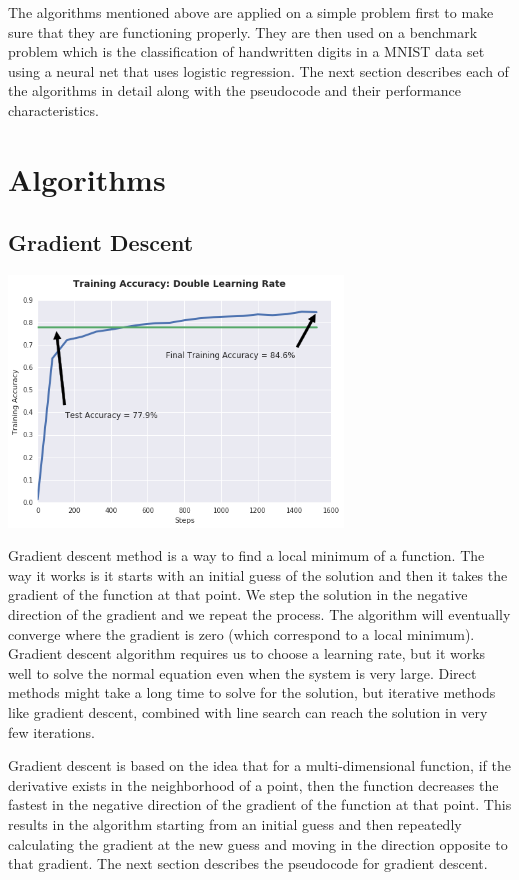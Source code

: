 \documentclass[10pt,twocolumn]{article}
\begin{document}
The algorithms mentioned above are applied on a simple problem first to make sure that they are functioning properly. They are then used on a benchmark problem which is the classification of handwritten digits in a MNIST data set using a neural net that uses logistic regression. The next section describes each of the algorithms in detail along with the pseudocode and their performance characteristics. 

\section{Algorithms}

\subsection{Gradient Descent}
	\includegraphics[width=3.5in]{plot1-GradDescent.png}

Gradient descent method is a way to find a local minimum of a function. The way it works is it starts with an initial guess of the solution and then it takes the gradient of the function at that point. We step the solution in the negative direction of the gradient and we repeat the process. The algorithm will eventually converge where the gradient is zero (which correspond to a local minimum). Gradient descent algorithm requires us to choose a learning rate, but it works well to solve the normal equation even when the system is very large. Direct methods might take a long time to solve for the solution, but iterative methods like gradient descent, combined with line search can reach the solution in very few iterations. 

Gradient descent is based on the idea that for a multi-dimensional function, if the derivative exists in the neighborhood of a point, then the function decreases the fastest in the negative direction of the gradient of the function  at that point. This results in the algorithm starting from an initial guess and then repeatedly calculating the gradient at the new guess and moving in the direction opposite to that gradient. The next section describes the pseudocode for gradient descent. 
\end{document}
